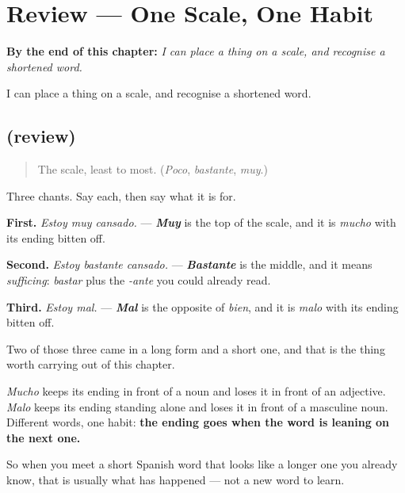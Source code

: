 
\chapter{Review --- One Scale, One Habit}
\label{ch:repaso-grado}

\begin{chapteropening}
\textbf{By the end of this chapter:} \emph{I can place a thing on a scale, and recognise a shortened word.}

I can place a thing on a scale, and recognise a shortened word.
\end{chapteropening}

\section[(review)]{(review)}

\label{lesson:ES-C60-repaso-grado}



\begin{quote}
The scale, least to most. (\emph{Poco}, \emph{bastante}, \emph{muy}.)
\end{quote}

\begin{grammarlens}[title={What you've built}]
Three chants. Say each, then say what it is for.

\textbf{First.} \emph{Estoy muy cansado.} — \emph{\textbf{Muy}} is the top of the scale, and it is \emph{mucho} with its ending bitten off.

\textbf{Second.} \emph{Estoy bastante cansado.} — \emph{\textbf{Bastante}} is the middle, and it means \emph{sufficing}: \emph{bastar} plus the \emph{-ante} you could already read.

\textbf{Third.} \emph{Estoy mal.} — \emph{\textbf{Mal}} is the opposite of \emph{bien}, and it is \emph{malo} with its ending bitten off.
\end{grammarlens}

\begin{grammarlens}[title={Grammar Lens: the habit underneath}]
Two of those three came in a long form and a short one, and that is the thing worth carrying out of this chapter.

\emph{Mucho} keeps its ending in front of a noun and loses it in front of an adjective. \emph{Malo} keeps its ending standing alone and loses it in front of a masculine noun. Different words, one habit: \textbf{the ending goes when the word is leaning on the next one.}

So when you meet a short Spanish word that looks like a longer one you already know, that is usually what has happened — not a new word to learn.
\end{grammarlens}

